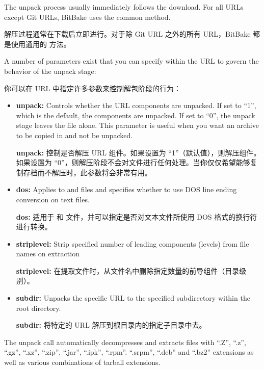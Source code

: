 
The unpack process usually immediately follows the download. For all URLs except Git URLs, BitBake uses the common  method.

解压过程通常在下载后立即进行。对于除 Git URL 之外的所有 URL，BitBake 都是使用通用的  方法。

A number of parameters exist that you can specify within the URL to govern the behavior of the unpack stage:

你可以在 URL 中指定许多参数来控制解包阶段的行为：

\begin{itemize}
\setlength\itemsep{1.0em}
\item \textbf{unpack:} Controls whether the URL components are unpacked. If set to ``1'', which is the default, the components are unpacked. If set to ``0'', the unpack stage leaves the file alone. This parameter is useful when you want an archive to be copied in and not be unpacked.

\medskip
\textbf{unpack:} 控制是否解压 URL 组件。如果设置为 ``1''（默认值），则解压组件。如果设置为 ``0''，则解压阶段不会对文件进行任何处理。当你仅仅希望能够复制存档而不解压时，此参数将会非常有用。

\item \textbf{dos:} Applies to  and  files and specifies whether to use DOS line ending conversion on text files.

\medskip
\textbf{dos:} 适用于  和  文件，并可以指定是否对文本文件所使用 DOS 格式的换行符进行转换。

\item \textbf{striplevel:} Strip specified number of leading components (levels) from file names on extraction

\medskip
\textbf{striplevel:} 在提取文件时，从文件名中删除指定数量的前导组件（目录级别）。

\item \textbf{subdir:} Unpacks the specific URL to the specified subdirectory within the root directory.

\medskip
\textbf{subdir:} 将特定的 URL 解压到根目录内的指定子目录中去。
\end{itemize}

The unpack call automatically decompresses and extracts files with ``.Z'', ``.z'', ``.gz'', ``.xz'', ``.zip'', ``.jar'', ``.ipk'', ``.rpm''. ``.srpm'', ``.deb'' and ``.bz2'' extensions as well as various combinations of tarball extensions.

